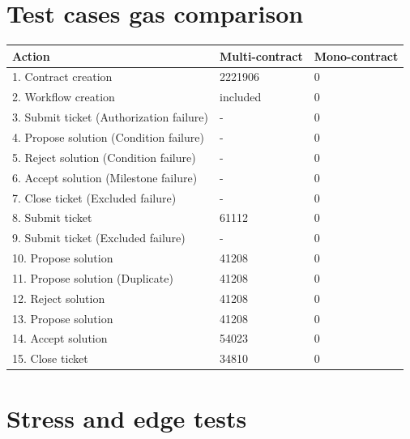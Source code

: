 \documentclass{article}
\begin{document}
	\section{Test cases gas comparison}
	\label{app:test-cases-gas}

		\begin{tabular}{| l | l | l |}
			\hline
			Action 										& Multi-contract & Mono-contract \\ \hline
			1. Contract creation						& 2221906		 & 0 \\\hline
			2. Workflow creation						& included 		 & 0 \\\hline
			3. Submit ticket (Authorization failure)	& -				 & 0 \\\hline
			4. Propose solution (Condition failure)		& -				 & 0 \\\hline
			5. Reject solution (Condition failure)		& -				 & 0 \\\hline
			6. Accept solution (Milestone failure)		& -				 & 0 \\\hline
			7. Close ticket (Excluded failure)			& -				 & 0 \\\hline
			8. Submit ticket							& 61112			 & 0 \\\hline
			9. Submit ticket (Excluded failure)			& -				 & 0 \\\hline
			10. Propose solution						& 41208			 & 0 \\\hline
			11. Propose solution (Duplicate)			& 41208			 & 0 \\\hline
			12. Reject solution							& 41208			 & 0 \\\hline
			13. Propose solution						& 41208			 & 0 \\\hline
			14. Accept solution							& 54023			 & 0 \\\hline
			15. Close ticket							& 34810			 & 0 \\\hline
			\hline
		\end{tabular}

	\section{Stress and edge tests}
	\label{app:stress-and-edge-tests}
\end{document}
